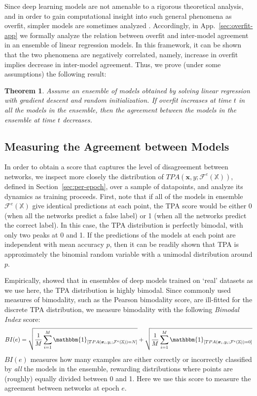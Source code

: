 \documentclass{article}
\newcommand{\bx}{\bm{x}}
\newcommand{\F}{\mathcal{F}}
\newcommand{\iX}{\mathbb{X}}
\newtheorem*{result*}{Theorem}
\begin{document}
Since deep learning models are not amenable to a rigorous theoretical analysis, and in order to gain computational insight into such general phenomena as overfit, simpler models are sometimes analyzed \citep[e.g.][]{weinshall2020theory}.  %
Accordingly, in App.~\ref{sec:overfit-app} we formally analyze the relation between overfit and inter-model agreement in an ensemble of linear regression models. In this framework, it can be shown that the two phenomena are negatively correlated, namely, increase in overfit implies decrease in inter-model agreement. Thus, we prove (under some assumptions) the following result:
\begin{result*}
Assume an ensemble of models obtained by solving linear regression with gradient descent and random initialization. If overfit \emph{increases} at time $t$ in all the models in the ensemble, then the agreement between the models in the ensemble at time $t$ \emph{decreases}.
\end{result*}


\subsection{Measuring the Agreement between Models}
\label{sec:BI-def}

In order to obtain a score that captures the level of disagreement between networks, we inspect more closely the distribution of $TPA(\bx,y;\F^e(\iX))$, defined in Section~\ref{sec:per-epoch}, over a sample of datapoints, and analyze its dynamics as training proceeds. First, note that if all of the models in ensemble $\F^e(\iX)$ give identical predictions at each point, the TPA score would be either 0 (when all the networks predict a false label) or 1 (when all the networks predict the correct label). In this case, the TPA distribution is perfectly bimodal, with only two peaks at 0 and 1. If the predictions of the models at each point are independent with mean accuracy $p$, then it can be readily shown that TPA is approximately the binomial random variable with a unimodal distribution around $p$. 

Empirically, \citep{hacohen2020let} showed that in ensembles of deep models trained on ‘real’ datasets as we use here, the TPA distribution is highly bimodal. Since commonly used measures of bimodality, such as the Pearson bimodality score, are ill-fitted for the discrete TPA distribution, we measure bimodality with the following \textit{Bimodal Index} score:
\begin{eqnarray}
\label{eq:BI}
BI(e) = \sqrt{\frac{1}{M}\sum_{i=1}^M\mathbbm{1}_{[TPA(\bx_i,y_i;\F^e(\iX))=N]}} + \sqrt{\frac{1}{M}\sum_{i=1}^M\mathbbm{1}_{[TPA(\bx_i,y_i;\F^e(\iX))=0]}}
\end{eqnarray}
$BI(e)$ measures how many examples are either correctly or incorrectly classified by \emph{all} the models in the ensemble, rewarding distributions where points are (roughly) equally divided between 0 and 1. Here we use this score to measure the agreement between networks at epoch $e$.
\end{document}
